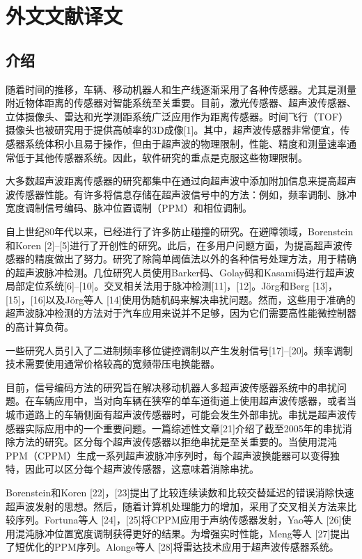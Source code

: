 \section{外文文献译文}
\subsection{介绍}
随着时间的推移，车辆、移动机器人和生产线逐渐采用了各种传感器。尤其是测量附近物体距离的传感器对智能系统至关重要。目前，激光传感器、超声波传感器、立体摄像头、雷达和光学测距系统广泛应用作为距离传感器。时间飞行（TOF）摄像头也被研究用于提供高帧率的3D成像[1]。其中，超声波传感器非常便宜，传感器系统体积小且易于操作，但由于超声波的物理限制，性能、精度和测量速率通常低于其他传感器系统。因此，软件研究的重点是克服这些物理限制。

大多数超声波距离传感器的研究都集中在通过向超声波中添加附加信息来提高超声波传感器性能。有许多将信息存储在超声波信号中的方法：例如，频率调制、脉冲宽度调制信号编码、脉冲位置调制（PPM）和相位调制。

自上世纪80年代以来，已经进行了许多防止碰撞的研究。在避障领域，Borenstein和Koren [2]–[5]进行了开创性的研究。此后，在多用户问题方面，为提高超声波传感器的精度做出了努力。研究了除简单阈值法以外的各种信号处理方法，用于精确的超声波脉冲检测。几位研究人员使用Barker码、Golay码和Kasami码进行超声波局部定位系统[6]–[10]。交叉相关法用于脉冲检测[11]，[12]。Jörg和Berg [13]，[15]，[16]以及Jörg等人 [14]使用伪随机码来解决串扰问题。然而，这些用于准确的超声波脉冲检测的方法对于汽车应用来说并不足够，因为它们需要高性能微控制器的高计算负荷。

一些研究人员引入了二进制频率移位键控调制以产生发射信号[17]–[20]。频率调制技术需要使用通常价格较高的宽频带压电换能器。

目前，信号编码方法的研究旨在解决移动机器人多超声波传感器系统中的串扰问题。在车辆应用中，当对向车辆在狭窄的单车道街道上使用超声波传感器，或者当城市道路上的车辆侧面有超声波传感器时，可能会发生外部串扰。串扰是超声波传感器实际应用中的一个重要问题。一篇综述性文章[21]介绍了截至2005年的串扰消除方法的研究。区分每个超声波传感器以拒绝串扰是至关重要的。当使用混沌PPM（CPPM）生成一系列超声波脉冲序列时，每个超声波换能器可以变得独特，因此可以区分每个超声波传感器，这意味着消除串扰。

Borenstein和Koren [22]，[23]提出了比较连续读数和比较交替延迟的错误消除快速超声波发射的思想。然后，随着计算机处理能力的增加，采用了交叉相关方法来比较序列。Fortuna等人 [24]，[25]将CPPM应用于声纳传感器发射，Yao等人 [26]使用混沌脉冲位置宽度调制获得更好的结果。为增强实时性能，Meng等人 [27]提出了短优化的PPM序列。Alonge等人 [28]将雷达技术应用于超声波传感器系统。

